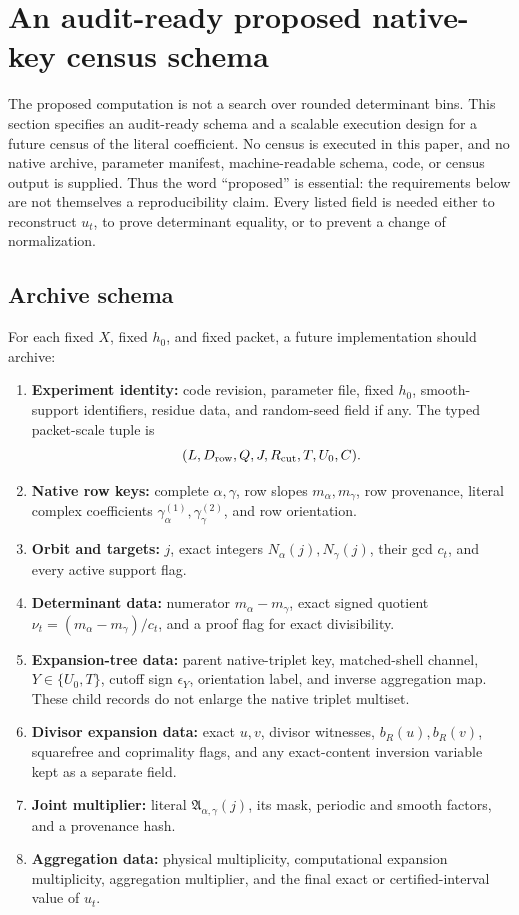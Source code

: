 \section{An audit-ready proposed native-key census schema}
\label{sec:census-protocol}

The proposed computation is not a search over rounded determinant
bins.  This section specifies an audit-ready schema and a scalable
execution design for a future census of the literal coefficient.
No census is executed in this paper, and no native archive, parameter
manifest, machine-readable schema, code, or census output is supplied.
Thus the word ``proposed'' is essential: the requirements below are
not themselves a reproducibility claim.  Every listed field is needed
either to reconstruct \(u_t\), to prove determinant equality, or to
prevent a change of normalization.

\subsection{Archive schema}

For each fixed \(X\), fixed \(h_0\), and fixed packet, a future
implementation should archive:
\begin{enumerate}[leftmargin=2.2em]
 \item \textbf{Experiment identity:} code revision, parameter file,
 fixed \(h_0\), smooth-support identifiers, residue data, and
 random-seed field if any.  The typed packet-scale tuple is
 \[
 (L,D_{\rm row},Q,J,R_{\rm cut},T,U_0,C).
 \]
 \item \textbf{Native row keys:} complete \(\alpha,\gamma\), row
 slopes \(m_\alpha,m_\gamma\), row provenance, literal complex
 coefficients \(\gamma_\alpha^{(1)},\gamma_\gamma^{(2)}\), and row
 orientation.
 \item \textbf{Orbit and targets:} \(j\), exact integers
 \(N_\alpha(j),N_\gamma(j)\), their gcd \(c_t\), and every active
 support flag.
 \item \textbf{Determinant data:} numerator
 \(m_\alpha-m_\gamma\), exact signed quotient
 \(\nu_t=(m_\alpha-m_\gamma)/c_t\), and a proof flag for exact
 divisibility.
 \item \textbf{Expansion-tree data:} parent native-triplet key,
 matched-shell channel, \(Y\in\{U_0,T\}\), cutoff sign
 \(\epsilon_Y\), orientation label, and inverse aggregation map.
 These child records do not enlarge the native triplet multiset.
 \item \textbf{Divisor expansion data:} exact \(u,v\), divisor witnesses,
 \(b_R(u),b_R(v)\), squarefree and coprimality flags, and any
 exact-content inversion variable kept as a separate field.
 \item \textbf{Joint multiplier:} literal
 \(\mathfrak A_{\alpha,\gamma}(j)\), its mask, periodic and smooth
 factors, and a provenance hash.
 \item \textbf{Aggregation data:} physical multiplicity,
 computational expansion multiplicity, aggregation multiplier, and
 the final exact or certified-interval value of \(u_t\).
\end{enumerate}

